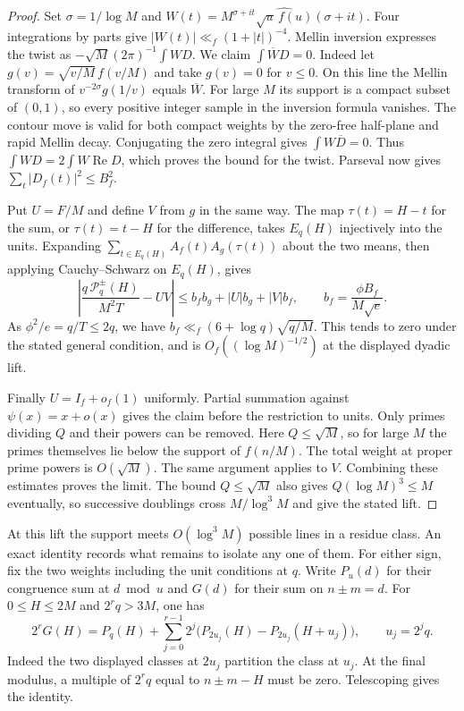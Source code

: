 \documentclass[11pt,a4paper]{article}
\DeclareMathOperator{\Rea}{Re}
\begin{document}
\begin{proof}
Set $\sigma=1/\log M$ and
$W(t)=M^{\sigma+it}\widehat{\sqrt u\,f(u)}(\sigma+it)$.
Four integrations by parts give $|W(t)|\ll_f(1+|t|)^{-4}$. Mellin
inversion expresses the twist as $-\sqrt M(2\pi)^{-1}\int W D$.
We claim $\int\overline W D=0$. Indeed let
$g(v)=\sqrt{v/M}\,f(v/M)$ and take $g(v)=0$ for $v\le0$.
On this line the Mellin transform of $v^{-2\sigma}g(1/v)$ equals
$\overline W$. For large $M$ its support is a compact subset of
$(0,1)$, so every positive integer sample in the inversion formula
vanishes. The contour move is valid for both compact weights by the
zero-free half-plane and rapid Mellin decay. Conjugating the zero
integral gives $\int W\overline D=0$. Thus $\int W D=2\int W\Rea D$,
which proves the bound for the twist.
Parseval now gives $\sum_t |D_f(t)|^2\le B_f^2$.

Put $U=F/M$ and define $V$ from $g$ in the same way. The map
$\tau(t)=H-t$ for the sum, or $\tau(t)=t-H$ for the difference,
takes $E_q(H)$ injectively into the units. Expanding
$\sum_{t\in E_q(H)}A_f(t)A_g(\tau(t))$ about the two means, then
applying Cauchy--Schwarz on $E_q(H)$, gives
\[
 \left|\frac{q\,\mathcal P_q^\pm(H)}{M^2T}-UV\right|
 \le b_f b_g+|U|b_g+|V|b_f,\qquad
 b_f=\frac{\phi B_f}{M\sqrt e}.
\]
As $\phi^2/e=q/T\le2q$, we have $b_f\ll_f(6+\log q)\sqrt{q/M}$.
This tends to zero under the stated general condition, and is
$O_f((\log M)^{-1/2})$ at the displayed dyadic lift.

Finally $U=I_f+o_f(1)$ uniformly. Partial summation against
$\psi(x)=x+o(x)$ gives the claim before the restriction to units.
Only primes dividing $Q$ and their powers can be removed.
Here $Q\le\sqrt M$, so for large $M$ the primes themselves lie below
the support of $f(n/M)$. The total weight at proper prime powers is
$O(\sqrt M)$. The same argument applies to $V$. Combining these
estimates proves the limit. The bound $Q\le\sqrt M$ also gives
$Q(\log M)^3\le M$ eventually, so successive doublings cross
$M/\log^3M$ and give the stated lift.
\end{proof}

At this lift the support meets $O(\log^3 M)$ possible lines in a
residue class. An exact identity records what remains to isolate any
one of them. For either sign, fix the two weights including the unit
conditions at $q$. Write $P_u(d)$ for their congruence sum at $d\bmod u$
and $G(d)$ for their sum on $n\pm m=d$. For $0\le H\le 2M$ and
$2^rq>3M$, one has
\[
 2^r G(H)=P_q(H)+\sum_{j=0}^{r-1}2^j
 \bigl(P_{2u_j}(H)-P_{2u_j}(H+u_j)\bigr),\qquad u_j=2^jq .
\]
Indeed the two displayed classes at $2u_j$ partition the class at
$u_j$. At the final modulus, a multiple of $2^rq$ equal to
$n\pm m-H$ must be zero. Telescoping gives the identity.
\end{document}
